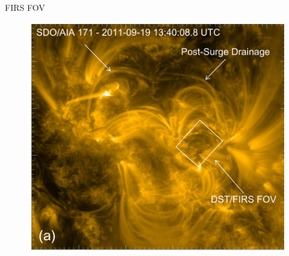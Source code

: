 \documentclass{beamer}
\begin{document}
\begin{frame}{FIRS FOV}

 
\begin{figure}[H]
 \centering
 \includegraphics[scale=0.5]{img1.png}
\end{figure}



\end{frame}
\end{document}
